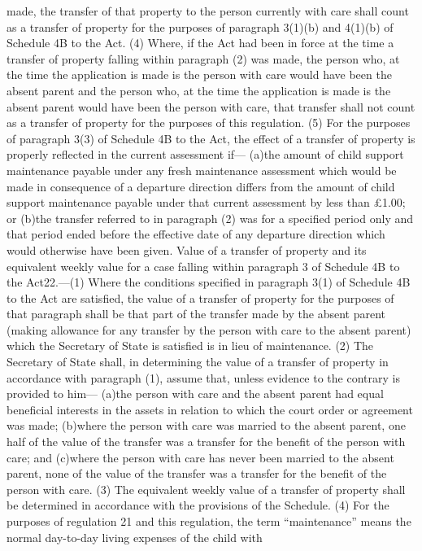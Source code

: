 \documentclass[a4paper]{article}
\begin{document}
made, the transfer of that property to the person currently with care shall
count as a transfer of property for the purposes of paragraph 3(1)(b) and
4(1)(b) of Schedule 4B to the Act.
(4) Where, if the Act had been in force at the time a transfer of property
falling within paragraph (2) was made, the person who, at the time the
application is made is the person with care would have been the absent parent
and the person who, at the time the application is made is the absent parent
would have been the person with care, that transfer shall not count as a
transfer of property for the purposes of this regulation.
(5) For the purposes of paragraph 3(3) of Schedule 4B to the Act, the effect of
a transfer of property is properly reflected in the current assessment if—
(a)the amount of child support maintenance payable under any fresh maintenance
assessment which would be made in consequence of a departure direction differs
from the amount of child support maintenance payable under that current
assessment by less than £1.00; or
(b)the transfer referred to in paragraph (2) was for a specified period only and
that period ended before the effective date of any departure direction which
would otherwise have been given.
Value of a transfer of property and its equivalent weekly value for a case
falling within paragraph 3 of Schedule 4B to the Act22.—(1) Where the conditions
specified in paragraph 3(1) of Schedule 4B to the Act are satisfied, the value
of a transfer of property for the purposes of that paragraph shall be that part
of the transfer made by the absent parent (making allowance for any transfer by
the person with care to the absent parent) which the Secretary of State is
satisfied is in lieu of maintenance.
(2) The Secretary of State shall, in determining the value of a transfer of
property in accordance with paragraph (1), assume that, unless evidence to the
contrary is provided to him—
(a)the person with care and the absent parent had equal beneficial interests in
the assets in relation to which the court order or agreement was made;
(b)where the person with care was married to the absent parent, one half of the
value of the transfer was a transfer for the benefit of the person with care;
and
(c)where the person with care has never been married to the absent parent, none
of the value of the transfer was a transfer for the benefit of the person with
care.
(3) The equivalent weekly value of a transfer of property shall be determined in
accordance with the provisions of the Schedule.
(4) For the purposes of regulation 21 and this regulation, the term
“maintenance” means the normal day-to-day living expenses of the child with
\end{document}
